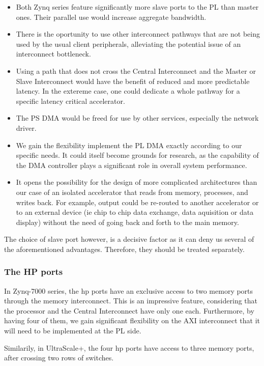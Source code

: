 \begin{itemize}
\item	Both Zynq series feature significantly more 
	slave ports to the PL than master ones.
	Their parallel use would increase aggregate bandwidth.
\item	There is the oportunity to use other interconnect pathways that are not
	being used by the usual client peripherals, alleviating the potential
	issue of an interconnect bottleneck.
\item	Using a path that does not cross the Central Interconnect and the
	Master or Slave Interconnect would have the benefit of 
	reduced and more predictable latency. 
	In the extereme case, one could dedicate a whole pathway 
	for a specific latency critical accelerator.
\item	The PS DMA would be freed for use by other services, 
	especially the network driver.
\item	We gain the flexibility implement the PL DMA
	exactly according to our specific needs.
	It could itself become grounds for research,
	as the capability of the DMA controller
	plays a significant role in overall system performance.
\item	It opens the possibility for the design of more complicated 
	architectures than our case of an isolated accelerator 
	that reads from memory, processes, and writes back.
	For example, output could be re-routed to 
	another accelerator or to an external device
	(ie chip to chip data exchange, data aquisition or data display)
	without the need of going back and forth to the main memory.
\end{itemize}

The choice of slave port however, is a decisive factor 
as it can deny us several of the aforementioned advantages.
Therefore, they should be treated separately.

\subsubsection{The HP ports}

In Zynq-7000 series, the \gls{hp} ports have an 
exclusive access to two memory ports 
through the memory interconnect.
This is an impressive feature, considering that the processor and
the Central Interconnect have only one each.
Furthermore, by having four of them, 
we gain significant flexibility on the AXI interconnect
that it will need to be implemented at the PL side.

Similarily, in UltraScale+, the four \gls{hp} ports have
access to three memory ports, after crossing two rows of switches.

